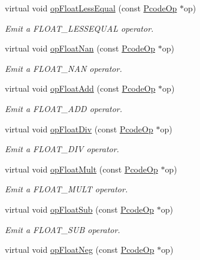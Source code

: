\begin{DoxyCompactItemize}
virtual void \mbox{\hyperlink{class_print_c_a35bdafb62ff66b128a1db2979c826740}{op\+Float\+Less\+Equal}} (const \mbox{\hyperlink{class_pcode_op}{Pcode\+Op}} $\ast$op)
\begin{DoxyCompactList}\small\item\em Emit a F\+L\+O\+A\+T\+\_\+\+L\+E\+S\+S\+E\+Q\+U\+AL operator. \end{DoxyCompactList}\item 
virtual void \mbox{\hyperlink{class_print_c_ad673439c7ef41ca0566f435d97e6bfbf}{op\+Float\+Nan}} (const \mbox{\hyperlink{class_pcode_op}{Pcode\+Op}} $\ast$op)
\begin{DoxyCompactList}\small\item\em Emit a F\+L\+O\+A\+T\+\_\+\+N\+AN operator. \end{DoxyCompactList}\item 
virtual void \mbox{\hyperlink{class_print_c_a94141c6f1c6b5aac87fb33c585f1df7c}{op\+Float\+Add}} (const \mbox{\hyperlink{class_pcode_op}{Pcode\+Op}} $\ast$op)
\begin{DoxyCompactList}\small\item\em Emit a F\+L\+O\+A\+T\+\_\+\+A\+DD operator. \end{DoxyCompactList}\item 
virtual void \mbox{\hyperlink{class_print_c_acfca0f711977658edff4f9c2a258f6fe}{op\+Float\+Div}} (const \mbox{\hyperlink{class_pcode_op}{Pcode\+Op}} $\ast$op)
\begin{DoxyCompactList}\small\item\em Emit a F\+L\+O\+A\+T\+\_\+\+D\+IV operator. \end{DoxyCompactList}\item 
virtual void \mbox{\hyperlink{class_print_c_ad1ca85eeef332f0af132add7d87f6d64}{op\+Float\+Mult}} (const \mbox{\hyperlink{class_pcode_op}{Pcode\+Op}} $\ast$op)
\begin{DoxyCompactList}\small\item\em Emit a F\+L\+O\+A\+T\+\_\+\+M\+U\+LT operator. \end{DoxyCompactList}\item 
virtual void \mbox{\hyperlink{class_print_c_adaae48280fb9643ac943acff6f484f27}{op\+Float\+Sub}} (const \mbox{\hyperlink{class_pcode_op}{Pcode\+Op}} $\ast$op)
\begin{DoxyCompactList}\small\item\em Emit a F\+L\+O\+A\+T\+\_\+\+S\+UB operator. \end{DoxyCompactList}\item 
virtual void \mbox{\hyperlink{class_print_c_a92f39888157b3a1695207e4978db9754}{op\+Float\+Neg}} (const \mbox{\hyperlink{class_pcode_op}{Pcode\+Op}} $\ast$op)

\end{DoxyCompactItemize}

